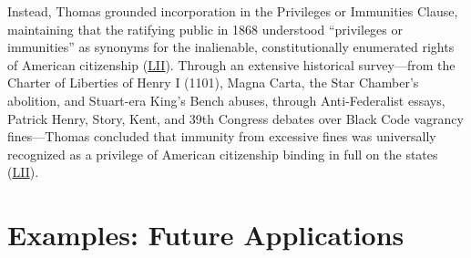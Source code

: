 \documentclass[12pt]{article}
\begin{document}
Instead, Thomas grounded incorporation in the Privileges or Immunities Clause, maintaining that the ratifying public in 1868 understood ``privileges or immunities'' as synonyms for the inalienable, constitutionally enumerated rights of American citizenship (\href{https://www.law.cornell.edu/supremecourt/text/17-1091}{LII}). Through an extensive historical survey---from the Charter of Liberties of Henry I (1101), Magna Carta, the Star Chamber's abolition, and Stuart-era King's Bench abuses, through Anti-Federalist essays, Patrick Henry, Story, Kent, and 39th Congress debates over Black Code vagrancy fines---Thomas concluded that immunity from excessive fines was universally recognized as a privilege of American citizenship binding in full on the states (\href{https://www.law.cornell.edu/supremecourt/text/17-1091}{LII}).

\section{Examples: Future Applications}
\end{document}
